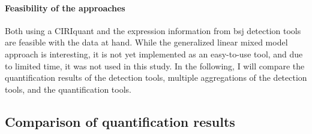 \paragraph{Feasibility of the approaches}
Both using a CIRIquant and the expression information from \gls{bsj} detection
tools are feasible with the data at hand.
While the generalized linear mixed model approach is interesting, it is not yet
implemented as an easy-to-use tool, and due to limited time, it was not used in
this study.
In the following, I will compare the quantification results of the detection
tools, multiple aggregations of the detection tools, and the quantification
tools.

\subsection{Comparison of quantification results}
